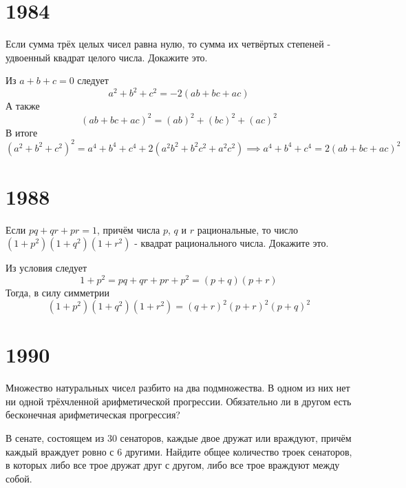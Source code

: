 \documentclass[11pt, a4paper]{common/document_template}
\begin{document}
\chapter{1984}

\begin{exercise}[882]
Если сумма трёх целых чисел равна нулю, то сумма их четвёртых степеней - удвоенный квадрат целого числа. Докажите это.
\end{exercise}

\begin{Solution}
Из $a + b + c = 0$ следует
$$
a^{2} + b^{2} + c^{2} = -2(ab + bc + ac) 
$$
А также
$$
(ab + bc + ac)^{2} = (ab)^{2} + (bc)^{2} + (ac)^{2}
$$
В итоге
$$
(a^{2} + b^{2} + c^{2})^{2} = a^{4} + b^{4} + c^{4} + 2(a^{2}b^{2} + b^{2}c^{2} + a^{2}c^{2}) \implies a^{4} + b^{4} + c^{4} = 2(ab + bc + ac)^{2}
$$
\end{Solution}

\chapter{1988}

\begin{exercise}[1088]
Если $pq + qr + pr = 1$, причём числа $p$, $q$ и $r$ рациональные, то число $(1 + p^{2})(1 + q^{2})(1 + r^{2})$ - квадрат рационального числа. Докажите это.
\end{exercise}

\begin{Solution}
Из условия следует
$$
1 + p^{2} = pq + qr + pr + p^{2} = (p + q)(p + r)
$$
Тогда, в силу симметрии
$$
(1 + p^{2})(1 + q^{2})(1 + r^{2}) = (q + r)^{2}(p + r)^{2}(p + q)^{2}
$$
\end{Solution}

\chapter{1990}

\begin{exercise}[1238]
Множество натуральных чисел разбито на два подмножества. В одном из них нет ни одной трёхчленной арифметической прогрессии. Обязательно ли в другом есть бесконечная арифметическая прогрессия?
\end{exercise}

\begin{exercise}[1244]
В сенате, состоящем из 30 сенаторов, каждые двое дружат или враждуют, причём каждый враждует ровно с 6 другими. Найдите общее количество троек сенаторов, в которых либо все трое дружат друг с другом, либо все трое враждуют между собой.
\end{exercise}
\end{document}
